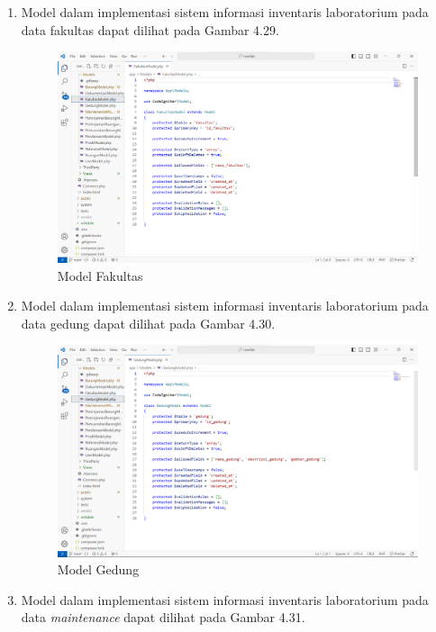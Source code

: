 \begin{enumerate}
  \item Model dalam implementasi sistem informasi inventaris laboratorium pada data fakultas dapat dilihat pada Gambar 4.29.

        \begin{figure}
          \centering
          \includegraphics[width=0.82\linewidth]{konten//gambar/fakultas model.png}
          \caption{Model Fakultas}
          \label{fig:enter-label}
        \end{figure}

  \item Model dalam implementasi sistem informasi inventaris laboratorium pada data gedung dapat dilihat pada Gambar 4.30.

        \begin{figure}
          \centering
          \includegraphics[width=0.82\linewidth]{konten//gambar/gedung model.png}
          \caption{Model Gedung}
          \label{fig:enter-label}
        \end{figure}

  \item Model dalam implementasi sistem informasi inventaris laboratorium pada data \textit{maintenance} dapat dilihat pada Gambar 4.31.


\end{enumerate}
